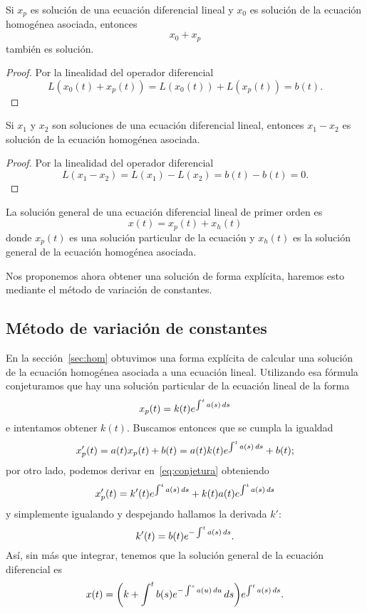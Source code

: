 \documentclass[../ecuaciones_diferenciales.tex]{subfiles}
\begin{document}
\begin{lemma}
	Si \(x_p\) es solución de una ecuación diferencial lineal y \(x_0\) es
	solución de la ecuación homogénea asociada, entonces \[x_0 + x_p\] también es
	solución.
\end{lemma}

\begin{proof}
	Por la linealidad del operador diferencial
	\[L(x_0(t) + x_p(t)) = L(x_0(t)) + L(x_p(t)) = b(t).\]
\end{proof}

\begin{lemma}
	Si \(x_1\) y \(x_2\) son soluciones de una ecuación diferencial lineal,
	entonces \(x_1 - x_2\) es solución de la ecuación homogénea asociada.
\end{lemma}

\begin{proof}
	Por la linealidad del operador diferencial
	\[L(x_1 - x_2) = L(x_1) - L(x_2) = b(t) - b(t) = 0.\]
\end{proof}

\begin{corollary}
	La solución general de una ecuación diferencial lineal de primer orden es
	\[x(t) = x_p(t) + x_h(t)\]
	donde \(x_p(t)\) es una solución particular de la ecuación y \(x_h(t)\) es
	la solución general de la ecuación homogénea asociada.
\end{corollary}

Nos proponemos ahora obtener una solución de forma explícita, haremos esto
mediante el método de variación de constantes.

\subsection{Método de variación de constantes}

En la sección~\ref{sec:hom} obtuvimos una forma explícita de calcular una 
solución de la ecuación homogénea asociada a una ecuación lineal. 
Utilizando esa fórmula conjeturamos que hay una solución particular de la 
ecuación lineal de la forma
\begin{equation} \label{eq:conjetura}
	x_p(t) = k(t) e^{\int^t a(s) \mathop{d\!} s}
\end{equation}
e intentamos obtener \(k(t)\). Buscamos entonces que se cumpla la igualdad
\[x'_p(t) = a(t)x_p(t) + b(t) = a(t)k(t) e^{\int^t a(s) \mathop{d\!} s} + b(t);\]
por otro lado, podemos derivar en~\eqref{eq:conjetura} obteniendo
\[x'_p(t) = k'(t) e^{\int^t a(s) \mathop{d\!} s} + k(t)a(t) e^{\int^t a(s) \mathop{d\!} s}\]
y simplemente igualando y despejando hallamos la derivada \(k'\):
\[k'(t) = b(t)e^{-\int^t a(s) \mathop{d\!} s}.\]
Así, sin más que integrar, tenemos que la solución general de la ecuación
diferencial es
\[x(t) = \parens{k + \int^t b(s) e^{-\int^s a(u) \dif u} \dif s}
	e^{\int^t a(s) \dif s}.\]
\end{document}
